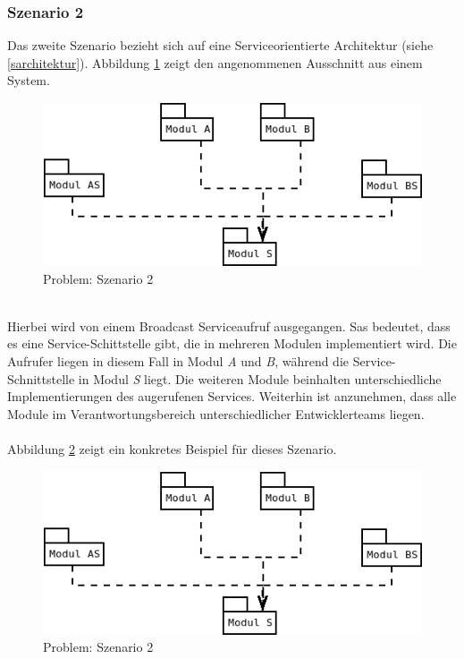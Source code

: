 \documentclass[11pt, 
ngerman,
doublespacing,
chapterinoneline, %
consistentlayout, %
]{scrartcl}
\begin{document}
\subsubsection{Szenario 2}
Das zweite Szenario bezieht sich auf eine Serviceorientierte Architektur (siehe \ref{sarchitektur}).
Abbildung \ref{fig:problem2} zeigt den angenommenen Ausschnitt aus einem System. 
\begin{figure}[h]
  \centering
  \includegraphics[scale=0.7]{pics/problemS2Abstrakt.png}
  \caption{Problem: Szenario 2}
  \label{fig:problem2}
\end{figure}\\
Hierbei wird von einem Broadcast Serviceaufruf ausgegangen. Sas bedeutet, dass es eine Service-Schittstelle gibt, die in mehreren Modulen implementiert wird. Die Aufrufer liegen in diesem Fall in Modul \emph{A} und \emph{B}, während die Service-Schnittstelle in Modul \emph{S} liegt. Die weiteren Module beinhalten unterschiedliche Implementierungen des augerufenen Services. Weiterhin ist anzunehmen, dass alle Module im Verantwortungsbereich unterschiedlicher Entwicklerteams liegen.\\\\
Abbildung \ref{fig:problem2Konkret} zeigt ein konkretes Beispiel für dieses Szenario.
\begin{figure}[h]
  \centering
  \includegraphics[scale=0.7]{pics/problemS2Abstrakt.png}
  \caption{Problem: Szenario 2}
  \label{fig:problem2Konkret}
\end{figure}\\
\end{document}
